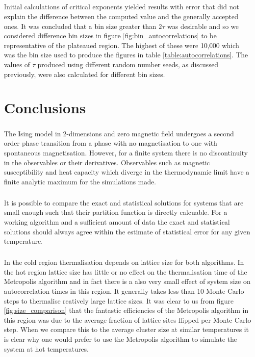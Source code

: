\documentclass[12pt] {report} %
\begin{document}
			\paragraph{}
				Initial calculations of critical exponents yielded results with error that did not explain the difference between the computed value and the generally accepted ones. It was concluded that a bin size greater than $2 \tau$ was desirable and so we considered difference bin sizes in figure \ref{fig:bin_autocorrelations} to be representative of the plateaued region. The highest of these were 10,000 which was the bin size used to produce the figures in table \ref{table:autocorrelations}. The values of $\tau$ produced using different random number seeds, as discussed previously, were also calculated for different bin sizes.
			
	


	
	
	\chapter{Conclusions}	\label{chapter:conclusions}
	
	\paragraph{}
		The Ising model in 2-dimensions and zero magnetic field undergoes a second order phase transition from a phase with no magnetisation to one with spontaneous magnetisation. However, for a finite system there is no discontinuity in the observables or their derivatives. Observables such as magnetic susceptibility and heat capacity which diverge in the thermodynamic limit have a finite analytic maximum for the simulations made.
		
	\paragraph{}
		It is possible to compare the exact and statistical solutions for systems that are small enough such that their partition function is directly calcuable. For a working algorithm and a sufficient amount of data the exact and statistical solutions should always agree within the estimate of statistical error for any given temperature.
		
	\paragraph{}
		In the cold region thermalisation depends on lattice size for both algorithms. In the hot region lattice size has little or no effect on the thermalisation time of the Metropolis algorithm and in fact there is a also very small effect of system size on autocorrelation times in this region. It generally takes less than 10 Monte Carlo steps to thermalise reatively large lattice sizes. It was clear to us from figure \ref{fig:size_comparison} that the fantastic efficiencies of the Metropolis algorithm in this region was due to the average fraction of lattice sites flipped per Monte Carlo step. When we compare this to the average cluster size at similar temperatures it is clear why one would prefer to use the Metropolis algorithm to simulate the system at hot temperatures.
		
\end{document}
